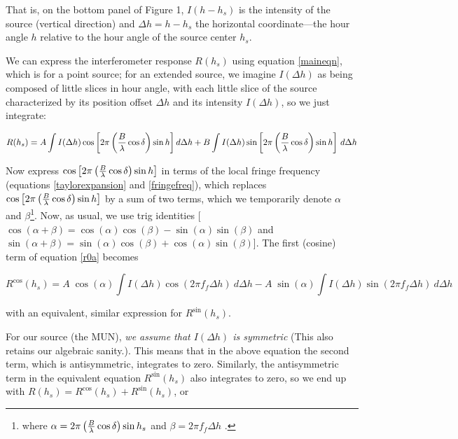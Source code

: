 \documentclass[11pt,preprint]{aastex}
\begin{document}
\noindent That is, on the bottom panel of
Figure 1, $I(h - h_s)$ is the intensity of the source (vertical
direction) and $\Delta h= h -h_s$ the horizontal coordinate---the hour
angle $h$ relative to the hour angle of the source center $h_s$. 


We can express the interferometer response $R(h_s)$ using equation
\ref{maineqn}, which is for a point source; for an extended source, we
imagine $I(\Delta h)$ as being composed of little slices in hour angle,
with each little slice of the source characterized by its position
offset $\Delta h$ and its intensity $I(\Delta h)$, so we just integrate:

\begin{equation} \label{r0a}
R(h_s) = A \int I(\Delta h) \cos \left[ 2\pi \left( {B \over \lambda}
	\cos\delta \right) \sin h\right] d \Delta h +  
	B \int I(\Delta h) \sin\left[ 2\pi \left( {B \over \lambda}
	\cos\delta \right) \sin h \right] \, d \Delta h
\end{equation} 

Now express $\cos \left[ 2\pi \left( {B \over \lambda} \cos\delta
\right) \sin h\right]$ in terms of the local fringe frequency (equations
\ref{taylorexpansion} and \ref{fringefreq}), which replaces $\cos \left[
2\pi \left( {B \over \lambda} \cos\delta \right) \sin h\right]$ by a sum
of two terms, which we temporarily denote $\alpha$ and
$\beta$\footnote{where $\alpha = 2 \pi \left( {B \over \lambda}
\cos\delta \right) \sin{h_s}$ and $\beta = 2 \pi f_f
\Delta h$ .}.  Now, as usual, we use trig identities [$\cos(\alpha +
\beta) = \cos(\alpha) \cos(\beta) - \sin(\alpha) \sin(\beta)$ and
$\sin(\alpha + \beta) = \sin(\alpha) \cos(\beta) + \cos(\alpha)
\sin(\beta)$]. The first (cosine) term of equation \ref{r0a} becomes

\begin{equation}
R^{\cos}(h_s) = A \; \cos(\alpha) \int I(\Delta h) \cos(2\pi f_f \Delta
h) \ d \Delta h 
-A \; \sin(\alpha) \int I(\Delta h) \sin(2\pi f_f \Delta
h) \ d \Delta h 
\end{equation}

\noindent with an equivalent, similar expression for $R^{\sin}(h_s)$.

For our source (the MUN), {\it we assume that $I(\Delta h)$ is
  symmetric} (This also retains our algebraic sanity.). This means that
in the above equation the second term, which is antisymmetric,
integrates to zero.  Similarly, the antisymmetric term in the equivalent
equation $R^{\sin}(h_s)$ also integrates to zero, so we end up with
$R(h_s) = R^{\cos}(h_s) + R^{\sin}(h_s)$, or
\end{document}
